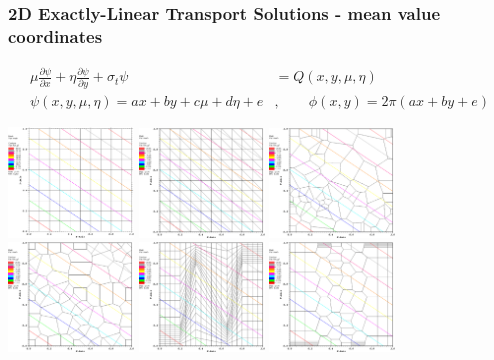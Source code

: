 \documentclass[compress,10pt]{beamer}
\begin{document}
\begin{frame}[t]\frametitle{2D Exactly-Linear Transport Solutions - mean value coordinates}
\begin{block}{}
\begin{equation*}
\begin{aligned}
\mu \frac{\partial  \psi}{\partial x} + \eta \frac{\partial  \psi}{\partial y} + \sigma_t \psi &= Q(x,y,\mu,\eta) \\
\psi (x,y,\mu,\eta) = a x + b y + c \mu + d \eta + e& , \qquad  \phi (x,y) = 2 \pi \left(   a x + b y  + e  \right)
\end{aligned}
\end{equation*}
\end{block}
\centering
\includegraphics[width=0.25\textwidth]{images/cart_MV_k1.eps} 
\includegraphics[width=0.25\textwidth]{images/tri_MV_k1.eps} 
\includegraphics[width=0.25\textwidth]{images/shes_poly_MV_k1.eps} 
\vspace{0.2cm}
\includegraphics[width=0.25\textwidth]{images/smooth_poly_MV_k1.eps} 
\includegraphics[width=0.25\textwidth]{images/z_quad_MV_k1.eps}
\includegraphics[width=0.25\textwidth]{images/z_poly_MV_k1.eps}
\end{frame}
\end{document}
